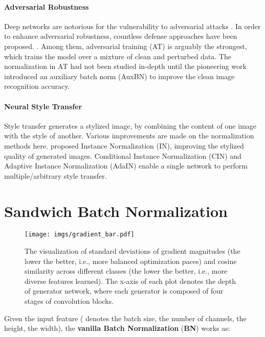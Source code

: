 \documentclass{article}
\begin{document}
\paragraph{Adversarial Robustness}
Deep networks are notorious for the vulnerability to adversarial attacks \citep{goodfellow2014explaining}. In order to enhance adversarial robustness, countless defense approaches have been proposed. \citep{dhillon2018stochastic,papernot2017extending,xu2017feature,meng2017magnet,liao2018defense,madry2017towards}. Among them, adversarial training (AT) \citep{madry2017towards} is arguably the strongest, which trains the model over a mixture of clean and perturbed data. The normalization in AT had not been studied in-depth until the pioneering work \citep{xie2019adversarial} introduced an auxiliary batch norm (AuxBN) to improve the clean image recognition accuracy.

\paragraph{Neural Style Transfer}
Style transfer generates a stylized image, by combining the content of one image with the style of another. Various improvements are made on the normalization methods here. \cite{ulyanov2016instance} proposed Instance Normalization (IN), improving the stylized quality of generated images. Conditional Instance Normalization (CIN) \citep{dumoulin2016learned} and Adaptive Instance Normalization (AdaIN) \citep{huang2017arbitrary} enable a single network to perform multiple/arbitrary style transfer. \section{Sandwich Batch Normalization\label{sec:SaBN}}
\begin{figure*}[ht!]
    \centering
    \texttt{[image: imgs/gradient\_bar.pdf]}
    \vspace{-15pt}
    \caption{The visualization of standard deviations of gradient magnitudes (the lower the better, i.e., more balanced optimization paces) and cosine similarity across different classes (the lower the better, i.e., more diverse features learned). The x-axis of each plot denotes the depth of generator network, where each generator is composed of four stages of convolution blocks.}
    \vspace{-5pt}
    \label{fig:gan_gradient}
\end{figure*}
Given the input feature  ( denotes the batch size,  the number of channels,  the height,  the width), the \textbf{vanilla Batch Normalization} (\textbf{BN}) works as:
\end{document}
